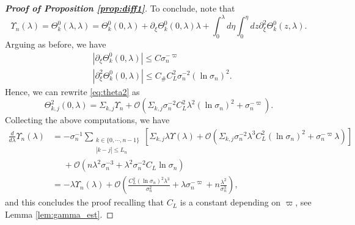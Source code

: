 \documentclass{amsart}
\numberwithin{equation}{section}
\newcommand\cO{{\mathcal O}}
\newcommand{\Const}{C_{\#}}
\begin{document}
\begin{proof}[\bf \em Proof of Proposition \ref{prop:diff1}]
To conclude, note that
\begin{equation}\label{eq:theta0}
\Upsilon_n(\lambda)=\Theta^0_k(\lambda,\lambda)=\Theta^0_k(0,\lambda)+\partial_\xi\Theta^0_k(0,\lambda)\lambda+\int_0^\lambda d\eta\int_0^\eta dz\partial_\xi^2\Theta^0_k(z,\lambda).
\end{equation}
Arguing as before, we have
\begin{equation}\label{eq:theta0_bis}
\begin{split}
&|\partial_\xi\Theta^0_k(0,\lambda)|\leq C\sigma_n^{-\varpi}\\
&|\partial_\xi^2\Theta^0_k(0,\lambda)|\leq \Const C_L^2\sigma_n^{-2}(\ln \sigma_n)^2.
\end{split}
\end{equation}
Hence, we can rewrite \eqref{eq:theta2} as
\begin{equation}\label{eq:theta2_bis}
\Theta^2_{k,j}(0,\lambda)=\Sigma_{k,j}\Upsilon_n +\cO\left(\Sigma_{k,j}\sigma_n^{-2}C_L^2\lambda^2(\ln \sigma_n)^2+\sigma_n^{-\varpi}\right).
\end{equation}
Collecting the above computations, we have
\[
\begin{split}
\frac{d}{d\lambda}\Upsilon_n(\lambda)&=-\sigma_n^{-1}\sum_{\substack{k\in\{0,\cdots,n-1\}\\|k-j|\leq L_n}}\left[\Sigma_{k,j}\lambda \Upsilon(\lambda)+\cO\left(\Sigma_{k,j}\sigma_n^{-2}\lambda^3C_L^2(\ln \sigma_n)^2+\sigma_n^{-\varpi}\lambda\right)\right]\\
&\phantom{=}+\cO\left(n\lambda^2\sigma_n^{-3}+\lambda^2\sigma_n^{-2}C_L \ln \sigma_n\right)\\
&=-\lambda \Upsilon_n(\lambda)+\cO\left(\frac{C_L^2(\ln \sigma_n)^2\lambda^3}{\sigma_n^2}+\lambda \sigma_n^{-\varpi}+n\frac{\lambda^2}{\sigma_n^3}\right),
\end{split}
\]
and this concludes the proof recalling that $C_L$ is a constant depending on $\varpi$, see Lemma \ref{lem:gamma_est}.
\end{proof}

\end{document}
